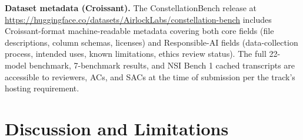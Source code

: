 \documentclass{article}
\begin{document}
\textbf{Dataset metadata (Croissant).} The ConstellationBench release at \url{https://huggingface.co/datasets/AirlockLabs/constellation-bench} includes Croissant-format machine-readable metadata covering both core fields (file descriptions, column schemas, licenses) and Responsible-AI fields (data-collection process, intended uses, known limitations, ethics review status). The full 22-model benchmark, 7-benchmark results, and NSI Bench 1 cached transcripts are accessible to reviewers, ACs, and SACs at the time of submission per the track's hosting requirement.

\section{Discussion and Limitations}
\label{sec:discussion}

%
\end{document}
